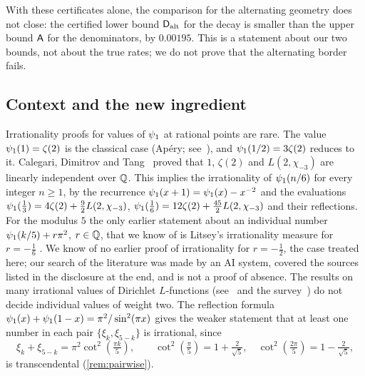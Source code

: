 With these certificates alone, the comparison for the alternating geometry does not close: the
certified lower bound $\mathsf{D}_{\mathrm{alt}}$ for the decay is smaller than the upper bound $\mathsf{A}$ for the
denominators, by $0.00195$. This is a statement about our two bounds, not about the true rates;
we do not prove that the alternating border fails.

\subsection{Context and the new ingredient}\label{subsec:context}

Irrationality proofs for values of $\psi_1$ at rational points are rare. The value
$\psi_1(1)=\zeta(2)$ is the classical case (Ap\'ery; see~\cite{vanderPoorten1979,Beukers1979}),
and $\psi_1(1/2)=3\zeta(2)$ reduces to it. Calegari, Dimitrov and Tang~\cite{CDT2024} proved that
$1$, $\zeta(2)$ and $L(2,\chi_{-3})$ are linearly independent over $\mathbb{Q}$. This implies the
irrationality of $\psi_1(n/6)$ for every integer $n\ge1$, by the recurrence
$\psi_1(x+1)=\psi_1(x)-x^{-2}$ and the evaluations $\psi_1(\frac13)=4\zeta(2)+\frac92L(2,\chi_{-3})$,
$\psi_1(\frac16)=12\zeta(2)+\frac{45}2L(2,\chi_{-3})$ and their reflections. For the modulus $5$ the
only earlier statement about an individual number $\psi_1(k/5)+r\pi^2$, $r\in\mathbb{Q}$, that we know of is
Litsey's irrationality measure for $r=-\frac16$ \cite[Theorem~1.6(ii)]{Litsey2026Lowner}. We know
of no earlier proof of irrationality for $r=-\frac12$, the case treated here; our search of the
literature was made by an AI system, covered the sources listed in the disclosure at the end, and
is not a proof of absence. The results
on many irrational values of Dirichlet $L$-functions (see~\cite{Fischler2020L,RivoalZudilin2003}
and the survey~\cite{Fischler2004Bourbaki}) do not decide individual values of weight two. The
reflection formula $\psi_1(x)+\psi_1(1-x)=\pi^2/\sin^2(\pi x)$ \cite[5.15.6]{DLMF} gives the weaker
statement that at least one number in each pair $\{\xi_k,\xi_{5-k}\}$ is irrational, since
\begin{equation}\label{eq:pair-sum}
  \xi_k+\xi_{5-k}=\pi^2\cot^2\!\left(\tfrac{\pi k}5\right),\qquad
  \cot^2\!\left(\tfrac\pi5\right)=1+\tfrac2{\sqrt5},\quad
  \cot^2\!\left(\tfrac{2\pi}5\right)=1-\tfrac2{\sqrt5},
\end{equation}
is transcendental (\cref{rem:pairwise}).

